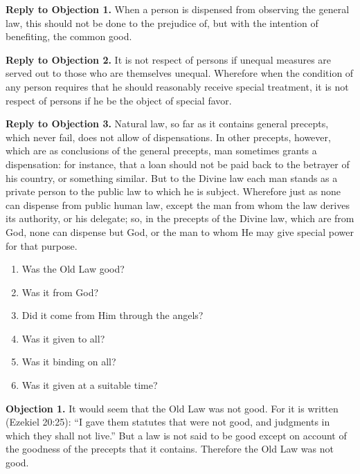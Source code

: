 \textbf{Reply to Objection 1.} When a person is dispensed from observing the general law, this should not be done to the prejudice of, but with the intention of benefiting, the common good.

\textbf{Reply to Objection 2.} It is not respect of persons if unequal measures are served out to those who are themselves unequal. Wherefore when the condition of any person requires that he should reasonably receive special treatment, it is not respect of persons if he be the object of special favor.

\textbf{Reply to Objection 3.} Natural law, so far as it contains general precepts, which never fail, does not allow of dispensations. In other precepts, however, which are as conclusions of the general precepts, man sometimes grants a dispensation: for instance, that a loan should not be paid back to the betrayer of his country, or something similar. But to the Divine law each man stands as a private person to the public law to which he is subject. Wherefore just as none can dispense from public human law, except the man from whom the law derives its authority, or his delegate; so, in the precepts of the Divine law, which are from God, none can dispense but God, or the man to whom He may give special power for that purpose.




\begin{enumerate}

\item  Was the Old Law good? 
\item  Was it from God? 
\item  Did it come from Him through the angels? 
\item  Was it given to all? 
\item  Was it binding on all? 
\item  Was it given at a suitable time? 
\end{enumerate}


\textbf{Objection 1.} It would seem that the Old Law was not good. For it is written (Ezekiel 20:25): ``I gave them statutes that were not good, and judgments in which they shall not live.'' But a law is not said to be good except on account of the goodness of the precepts that it contains. Therefore the Old Law was not good.

